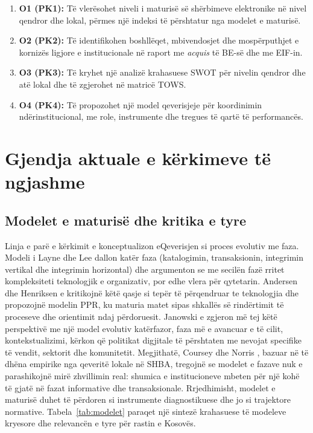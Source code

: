 \documentclass[conference]{IEEEtran}
\begin{document}
\begin{enumerate}
  \item \textbf{O1 (PK1):} Të vlerësohet niveli i maturisë së shërbimeve
        elektronike në nivel qendror dhe lokal, përmes një indeksi të
        përshtatur nga modelet e maturisë.
  \item \textbf{O2 (PK2):} Të identifikohen boshllëqet, mbivendosjet dhe
        mospërputhjet e kornizës ligjore e institucionale në raport me
        \textit{acquis} të BE-së dhe me EIF-in.
  \item \textbf{O3 (PK3):} Të kryhet një analizë krahasuese SWOT për
        nivelin qendror dhe atë lokal dhe të zgjerohet në matricë TOWS.
  \item \textbf{O4 (PK4):} Të propozohet një model qeverisjeje për
        koordinimin ndërinstitucional, me role, instrumente dhe tregues
        të qartë të performancës.
\end{enumerate}

\section{Gjendja aktuale e kërkimeve të ngjashme}
\label{sec:sota}

\subsection{Modelet e maturisë dhe kritika e tyre}
Linja e parë e kërkimit e konceptualizon eQeverisjen si proces evolutiv me
faza. Modeli i Layne dhe Lee \cite{layne2001} dallon katër faza
(katalogimin, transaksionin, integrimin vertikal dhe integrimin
horizontal) dhe argumenton se me secilën fazë rritet kompleksiteti
teknologjik e organizativ, por edhe vlera për qytetarin. Andersen dhe
Henriksen \cite{andersen2006} e kritikojnë këtë qasje si tepër të
përqendruar te teknologjia dhe propozojnë modelin PPR, ku maturia matet
sipas shkallës së rindërtimit të proceseve dhe orientimit ndaj
përdoruesit. Janowski \cite{janowski2015} e zgjeron më tej këtë
perspektivë me një model evolutiv katërfazor, faza më e avancuar e të
cilit, kontekstualizimi, kërkon që politikat digjitale të përshtaten me
nevojat specifike të vendit, sektorit dhe komunitetit. Megjithatë, Coursey
dhe Norris \cite{coursey2008}, bazuar në të dhëna empirike nga qeveritë
lokale në SHBA, tregojnë se modelet e fazave nuk e parashikojnë mirë
zhvillimin real: shumica e institucioneve mbeten për një kohë të gjatë në
fazat informative dhe transaksionale. Rrjedhimisht, modelet e maturisë
duhet të përdoren si instrumente diagnostikuese dhe jo si trajektore
normative. Tabela~\ref{tab:modelet} paraqet një sintezë krahasuese të
modeleve kryesore dhe relevancën e tyre për rastin e Kosovës.
\end{document}
